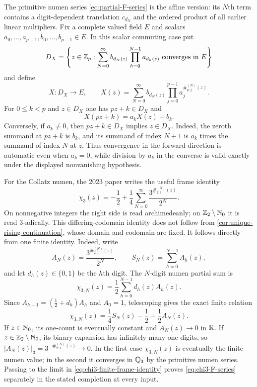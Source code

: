 The primitive numen series \cref{eq:partial-F-series} is the affine version:
its $N$th term contains a digit-dependent translation $c_{d_N}$ and the
ordered product of all earlier linear multipliers.  Fix a complete valued
field $E$ and scalars $a_0,\ldots,a_{p-1},b_0,\ldots,b_{p-1}\in E$.  In this
scalar commuting case put
\[
 D_X=\left\{z\in\mathbb Z_p:
 \sum_{N=0}^{\infty}b_{d_N(z)}
  \prod_{h=0}^{N-1}a_{d_h(z)}\text{ converges in }E\right\}
\]
and define
\begin{equation}
\label{eq:scalar-affine-F-series}
 X:D_X\longrightarrow E,\qquad
 X(z)=\sum_{N=0}^{\infty}b_{d_N(z)}
 \prod_{j=0}^{p-1}a_j^{\#^{(N)}_{p:j}(z)}.
\end{equation}
For $0\leq k<p$ and $z\in D_X$ one has $pz+k\in D_X$ and
\begin{equation}
\label{eq:scalar-affine-FE}
 X(pz+k)=a_kX(z)+b_k.
\end{equation}
Conversely, if $a_k\ne0$, then $pz+k\in D_X$ implies $z\in D_X$.
Indeed, the zeroth summand at $pz+k$ is $b_k$, and its summand of index
$N+1$ is $a_k$ times the summand of index $N$ at $z$.  Thus convergence in
the forward direction is automatic even when $a_k=0$, while division by
$a_k$ in the converse is valid exactly under the displayed nonvanishing
hypothesis.

For the Collatz numen, the 2023 paper writes the useful frame identity
\begin{equation}
\label{eq:chi3-F-series}
 \chi_3(z)=-\frac12+\frac14
 \sum_{N=0}^{\infty}\frac{3^{\#^{(N)}_{2:1}(z)}}{2^N}.
\end{equation}
On nonnegative integers the right side is read archimedeanly; on
$\mathbb Z_2\setminus\mathbb N_0$ it is read $3$-adically.  This differing-codomain
identity does not follow from \cref{cor:unique-rising-continuation}, whose
domain and codomain are fixed.  It follows directly from one finite identity.
Indeed, write
\[
 A_N(z)=\frac{3^{\#^{(N)}_{2:1}(z)}}{2^N},
 \qquad S_N(z)=\sum_{h=0}^{N-1}A_h(z),
\]
and let $d_h(z)\in\{0,1\}$ be the $h$th digit.  The $N$-digit numen partial
sum is
\[
 \chi_{3,N}(z)=\frac12\sum_{h=0}^{N-1}d_h(z)A_h(z).
\]
Since $A_{h+1}=(\frac12+d_h)A_h$ and $A_0=1$, telescoping gives the exact
finite relation
\begin{equation}
\label{eq:chi3-finite-frame-identity}
 \chi_{3,N}(z)=\frac14S_N(z)-\frac12+\frac12A_N(z).
\end{equation}
If $z\in\mathbb N_0$, its one-count is eventually constant and $A_N(z)\to0$ in
$\mathbb R$.  If $z\in\mathbb Z_2\setminus\mathbb N_0$, its binary expansion has infinitely many
one digits, so $|A_N(z)|_3=3^{-\#^{(N)}_{2:1}(z)}\to0$.  In the first case
$\chi_{3,N}(z)$ is eventually the finite numen value; in the second it
converges in $\mathbb Q_3$ by the primitive numen series.  Passing to the limit in
\cref{eq:chi3-finite-frame-identity} proves
\cref{eq:chi3-F-series} separately in the stated completion at every input.

